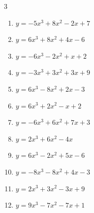\begin{multicols}{3}
\begin{enumerate}
  \item $y=-5x^{3}+8x^{2}-2x+7$


  \item $y=6x^{3}+8x^{2}+4x-6$


\columnbreak %

  \item $y=-6x^{3}-2x^{2}+x+2$


  \item $y=-3x^{3}+3x^{2}+3x+9$


  \item $y=6x^{3}-8x^{2}+2x-3$


  \item $y=6x^{3}+2x^{2}-x+2$


  \item $y=-6x^{3}+6x^{2}+7x+3$


  \item $y=2x^{3}+6x^{2}-4x$


  \item $y=6x^{3}-2x^{2}+5x-6$


  \item $y=-8x^{3}-8x^{2}+4x-3$


  \item $y=2x^{3}+3x^{2}-3x+9$


  \item $y=9x^{3}-7x^{2}-7x+1$



\end{enumerate}
\end{multicols}

